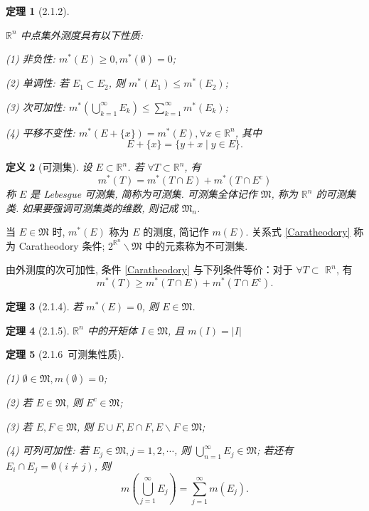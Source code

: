 \documentclass[10pt,openany]{book}
\theoremstyle{thmstyle} %
\newtheorem{theorem}{定理}[chapter]
\theoremstyle{defstyle} %
\newtheorem{definition}[theorem]{定义}
\theoremstyle{prostyle} %
\begin{document}
\begin{theorem}[2.1.2] \

$\mathbb{R}^n$ 中点集外测度具有以下性质:

(1) 非负性: $m^*(E) \geq 0, m^*(\emptyset)=0$;

(2) 单调性: 若 $E_1 \subset E_2$, 则 $m^*\left(E_1\right) \leq m^*\left(E_2\right)$;

(3) 次可加性: $m^*\left(\bigcup_{k=1}^{\infty} E_k\right) \leq \sum_{k=1}^{\infty} m^*\left(E_k\right)$;

(4) 平移不变性: $m^*(E+\{x\})=m^*(E), \forall x \in \mathbb{R}^n$, 其中
$$
E+\{x\}=\{y+x \mid y \in E\} .
$$

\end{theorem}


\begin{definition}[可测集]
设 $E \subset \mathbb{R}^n$. 若 $\forall T \subset \mathbb{R}^n$, 有
\begin{equation}
m^*(T)=m^*(T \cap E)+m^*\left(T \cap E^{\mathrm{c}}\right) \label{Caratheodory}
\end{equation}
称 $E$ 是 Lebesgue 可测集, 简称为可测集. 可测集全体记作 $\mathfrak{M}$, 称为 $\mathbb{R}^n$ 的可测集类. 如果要强调可测集类的维数, 则记成 $\mathfrak{M}_n$.
\end{definition}

当 $E \in \mathfrak{M}$ 时, $m^*(E)$ 称为 $E$ 的测度, 简记作 $m(E)$. 关系式 \eqref{Caratheodory} 称为 Caratheodory 条件; $2^{\mathbb{R}^n} \backslash \mathfrak{M}$ 中的元素称为不可测集.

由外测度的次可加性, 条件 \eqref{Caratheodory} 与下列条件等价：对于 $\forall T \subset$ $\mathbb{R}^n$, 有
$$
m^*(T) \geq m^*(T \cap E)+m^*\left(T \cap E^{\mathrm{c}}\right) .
$$

\begin{theorem}[2.1.4]
若 $m^*(E)=0$, 则 $E \in \mathfrak{M}$.
\end{theorem}

\begin{theorem}[2.1.5]
$\mathbb{R}^n$ 中的开矩体 $I \in \mathfrak{M}$, 且 $m(I)=\left\vert I \right\vert$
\end{theorem}

\begin{theorem}[2.1.6~可测集性质] \

(1) $\emptyset \in \mathfrak{M}, m(\emptyset)=0$; 

(2) 若 $E \in \mathfrak{M}$, 则 $E^c \in \mathfrak{M}$; 

(3) 若 $E, F \in \mathfrak{M}$, 则 $E \cup F, E \cap F, E \backslash F \in \mathfrak{M}$; 

(4) 可列可加性: 若 $E_j \in \mathfrak{M}, j=1,2, \cdots$, 则 $\bigcup_{n=1}^{\infty} E_j \in \mathfrak{M}$; 若还有 $E_i \cap E_j=\emptyset(i \neq j)$, 则
$$
m\left(\bigcup_{j=1}^{\infty} E_j\right)=\sum_{j=1}^{\infty} m\left(E_j\right) .
$$

\end{theorem}
\end{document}

